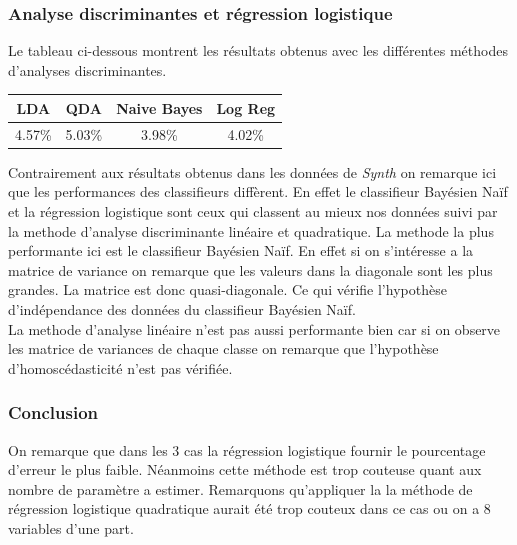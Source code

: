 \documentclass[10pt]{article}
\begin{document}
\subsubsection{Analyse discriminantes et régression logistique}
Le tableau ci-dessous montrent les résultats obtenus avec les différentes méthodes d'analyses discriminantes.
\begin{center}
	\begin{tabular}{|c | c | c| c| }
		\hline
	LDA & QDA & Naive Bayes & Log Reg \\
	\hline	
	4.57\% & 5.03\% & 3.98\% & 4.02\%
	\end{tabular}
\end{center}

Contrairement aux résultats obtenus dans les données de \textit{Synth} on remarque ici que les performances des classifieurs diffèrent. En effet le classifieur Bayésien Naïf et la régression logistique sont ceux qui classent au mieux nos données suivi par la methode d'analyse discriminante linéaire et quadratique. 
La methode la plus performante ici est le  classifieur Bayésien Naïf. En effet si on s'intéresse a la matrice de variance  on remarque que les valeurs dans la diagonale sont les plus grandes. La matrice est donc quasi-diagonale. Ce qui vérifie l'hypothèse d'indépendance des données du classifieur Bayésien Naïf. \\
La methode d'analyse linéaire n'est pas aussi performante bien car si on observe les matrice de variances de chaque classe on remarque que l'hypothèse d'homoscédasticité n'est pas vérifiée.

\subsubsection{Conclusion}
On remarque que dans les 3 cas la régression logistique fournir le pourcentage d'erreur le plus faible. Néanmoins cette méthode est trop couteuse quant aux nombre de paramètre a estimer. Remarquons qu'appliquer la la méthode de régression logistique quadratique aurait été trop couteux dans ce cas ou on a 8 variables d'une part. 
\end{document}
